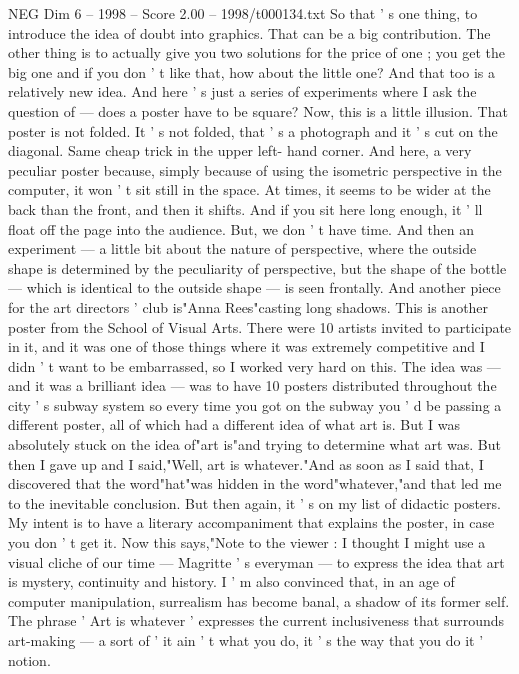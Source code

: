 \begin{textsample}{NEG Dim 6 – 1998 – Score 2.00 – 1998/t000134.txt}
So that ' s one thing, to introduce the idea of doubt into graphics.
That can be a big contribution.
The other thing is to actually give you two solutions for the price of one ; you get the big one and if you don ' t like that, how about the little one?
And that too is a relatively new idea.
And here ' s just a series of experiments where I ask the question of — does a poster have to be square?
Now, this is a little illusion.
That poster is not folded.
It ' s not folded, that ' s a photograph and it ' s cut on the diagonal.
Same cheap trick in the upper left- hand corner.
And here, a very peculiar poster because, simply because of using the isometric perspective in the computer, it won ' t sit still in the space.
At times, it seems to be wider at the back than the front, and then it shifts.
And if you sit here long enough, it ' ll float off the page into the audience.
But, we don ' t have time.
And then an experiment — a little bit about the nature of perspective, where the outside shape is determined by the peculiarity of perspective, but the shape of the bottle — which is identical to the outside shape — is seen frontally.
And another piece for the art directors ' club is"Anna Rees"casting long shadows.
This is another poster from the School of Visual Arts.
There were 10 artists invited to participate in it, and it was one of those things where it was extremely competitive and I didn ' t want to be embarrassed, so I worked very hard on this.
The idea was — and it was a brilliant idea — was to have 10 posters distributed throughout the city ' s subway system so every time you got on the subway you ' d be passing a different poster, all of which had a different idea of what art is.
But I was absolutely stuck on the idea of"art is"and trying to determine what art was.
But then I gave up and I said,"Well, art is whatever."And as soon as I said that, I discovered that the word"hat"was hidden in the word"whatever,"and that led me to the inevitable conclusion.
But then again, it ' s on my list of didactic posters.
My intent is to have a literary accompaniment that explains the poster, in case you don ' t get it.
Now this says,"Note to the viewer : I thought I might use a visual cliche of our time — Magritte ' s everyman — to express the idea that art is mystery, continuity and history.
I ' m also convinced that, in an age of computer manipulation, surrealism has become banal, a shadow of its former self.
The phrase ' Art is whatever ' expresses the current inclusiveness that surrounds art-making — a sort of ' it ain ' t what you do, it ' s the way that you do it ' notion.

\end{textsample}
